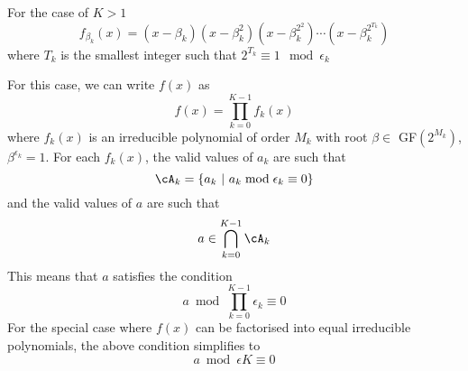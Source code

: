 
For the case of $K > 1$
\[
	f_{\beta_k}(x) = (x-\beta_k)\left(x-\beta_k^{2}\right)\left(x-\beta_k^{2^2}\right)\cdots\left(x-\beta_k^{2^{T_k}}\right)
\]
where $T_k$ is the smallest integer such that $2^{T_k} \equiv 1 \mod \epsilon_k$ 

For this case, we can write $f(x)$ as $$f(x)=\prod_{k=0}^{K-1}f_k(x)$$ where $f_k(x)$ is an irreducible polynomial of order $M_k$ with root $\beta \in $ GF$(2^{M_k})$, $\beta^{\epsilon_k}=1$. 
For each $f_k(x)$, the valid values of  $a_k$ are such that 
$$ \cA_k=\{a_k~ |~ a_k \bmod \epsilon_k \equiv 0\}$$ and the valid values of $a$ are such that
$$a \in  \bigcap_{k=0}^{K-1} \cA_k$$
This means that $a$ satisfies the condition
$$ a \bmod  \prod_{k=0}^{K-1} \epsilon_k \equiv 0$$
For the special case where $f(x)$ can be factorised into equal irreducible polynomials, the above condition simplifies to 
$$a \bmod \epsilon K \equiv 0$$

